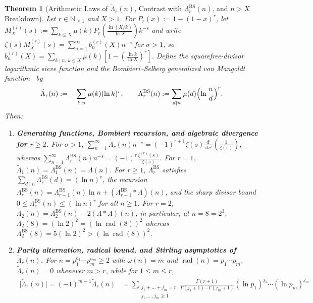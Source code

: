 \documentclass[11pt,reqno]{amsart}
\newtheorem{theorem}{Theorem}[section]
\theoremstyle{definition}
\theoremstyle{remark}
\numberwithin{equation}{section}
\newcommand{\dd}{\,\mathrm{d}}
\newcommand{\N}{\mathbb{N}}
\DeclareMathOperator{\rad}{rad}
\begin{document}
\begin{theorem}[Arithmetic Laws of $\widetilde{\Lambda}_r(n)$, Contrast with $\Lambda_r^{\mathrm{BS}}(n)$, and $n > X$ Breakdown]\label{thm:sieve_laws}
Let $r \in \N_{\ge 1}$ and $X > 1$. For $P_r(x) := 1 - (1-x)^r$, let $M_X^{(r)}(s) := \sum_{k \le X} \mu(k)P_r(\frac{\ln(X/k)}{\ln X})k^{-s}$ and write $\zeta(s)M_X^{(r)}(s) = \sum_{n=1}^{\infty} b_n^{(r)}(X)n^{-s}$ for $\sigma > 1$, so $b_n^{(r)}(X) = \sum_{k \mid n,\, k \le X} \mu(k)[1 - (\frac{\ln k}{\ln X})^r]$. Define the squarefree-divisor logarithmic sieve function and the Bombieri--Selberg generalized von Mangoldt function~\cite{bombieri1976,iwanieckowalski2004} by
\begin{equation}\label{eq:two_lambdas}
\widetilde{\Lambda}_r(n) := -\sum_{k \mid n} \mu(k)(\ln k)^r, \qquad \Lambda_r^{\mathrm{BS}}(n) := \sum_{d \mid n} \mu(d)\Bigl(\ln\frac{n}{d}\Bigr)^r.
\end{equation}
Then:
\begin{enumerate}[label=\textup{(\roman*)},leftmargin=2.2em]
\item \textbf{Generating functions, Bombieri recursion, and algebraic divergence for $r \ge 2$.} For $\sigma > 1$, $\sum_{n=1}^{\infty} \widetilde{\Lambda}_r(n)n^{-s} = (-1)^{r+1}\zeta(s)\frac{\dd^r}{\dd s^r}(\frac{1}{\zeta(s)})$, whereas $\sum_{n=1}^{\infty} \Lambda_r^{\mathrm{BS}}(n)n^{-s} = (-1)^r\frac{\zeta^{(r)}(s)}{\zeta(s)}$. For $r = 1$, $\widetilde{\Lambda}_1(n) = \Lambda_1^{\mathrm{BS}}(n) = \Lambda(n)$. For $r \ge 1$, $\Lambda_r^{\mathrm{BS}}$ satisfies $\sum_{d \mid n} \Lambda_r^{\mathrm{BS}}(d) = (\ln n)^r$, the recursion $\Lambda_r^{\mathrm{BS}}(n) = \Lambda_{r-1}^{\mathrm{BS}}(n)\ln n + (\Lambda_{r-1}^{\mathrm{BS}} * \Lambda)(n)$, and the sharp divisor bound $0 \le \Lambda_r^{\mathrm{BS}}(n) \le (\ln n)^r$ for all $n \ge 1$. For $r = 2$, $\widetilde{\Lambda}_2(n) = \Lambda_2^{\mathrm{BS}}(n) - 2(\Lambda * \Lambda)(n)$; in particular, at $n = 8 = 2^3$, $\widetilde{\Lambda}_2(8) = (\ln 2)^2 = (\ln\rad(8))^2$ whereas $\Lambda_2^{\mathrm{BS}}(8) = 5(\ln 2)^2 > (\ln\rad(8))^2$.
\item \textbf{Parity alternation, radical bound, and Stirling asymptotics of $\widetilde{\Lambda}_r(n)$.} For $n = p_1^{a_1}\cdots p_m^{a_m} \ge 2$ with $\omega(n) = m$ and $\rad(n) = p_1\cdots p_m$, $\widetilde{\Lambda}_r(n) = 0$ whenever $m > r$, while for $1 \le m \le r$,
\begin{equation}\label{eq:tilde_multinomial}
\begin{aligned}
\bigl\lvert\widetilde{\Lambda}_r(n)\bigr\rvert = (-1)^{m-1}\widetilde{\Lambda}_r(n) &= \sum_{\substack{j_1+\dots+j_m=r \\ j_1,\dots,j_m \ge 1}} \frac{\Gamma(r+1)}{\Gamma(j_1+1)\cdots\Gamma(j_m+1)}(\ln p_1)^{j_1}\cdots(\ln p_m)^{j_m} \\

\end{aligned}
\end{equation}
\end{enumerate}
\end{theorem}
\end{document}
